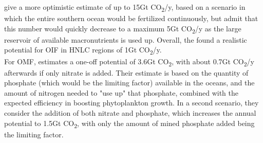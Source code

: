 \textcite{Keller2014PotentialScenario} give a more optimistic estimate of up to 15Gt CO\textsubscript{2}/y, based on a scenario in which the entire southern ocean would be fertilized continuously, but admit that this number would quickly decrease to a maximum 5Gt CO\textsubscript{2}/y as the large reservoir of available macronutrients is used up.
Overall, the \textcite[87]{NationalAcademiesofSciences2022ASequestration} found a realistic potential for OIF in HNLC regions of 1Gt CO\textsubscript{2}/y.\\
For OMF, \textcite{Harrison2017GlobalFertilization} estimates a one-off potential of 3.6Gt CO\textsubscript{2}, with about 0.7Gt CO\textsubscript{2}/y afterwards if only nitrate is added. Their estimate is based on the quantity of phosphate (which would be the limiting factor) available in the oceans, and the amount of nitrogen needed to "use up" that phosphate, combined with the expected efficiency in boosting phytoplankton growth. In a second scenario, they consider the addition of both nitrate and phosphate, which increases the annual potential to 1.5Gt CO\textsubscript{2}, with only the amount of mined phosphate added being the limiting factor.
